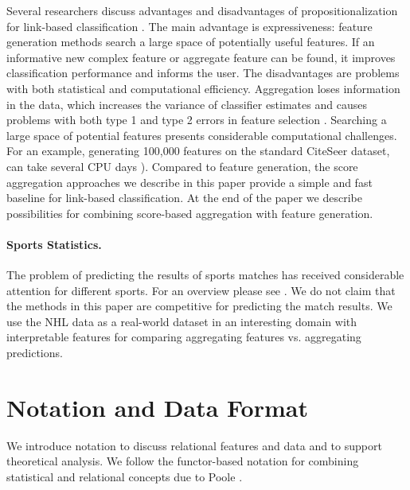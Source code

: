 \documentclass[oribibl]{llncs}%
\begin{document}
Several researchers discuss advantages and disadvantages of  propositionalization for link-based classification \cite{DavidJensen2002,han2009}. 
The main advantage is expressiveness: feature generation methods search a large space of potentially useful features. If an informative new complex feature or aggregate feature can be found, it improves classification performance and informs the user. The disadvantages are problems with both statistical and computational efficiency. Aggregation loses information in the data, which increases the variance of classifier estimates and causes problems with both type 1 and type 2 errors in feature selection \cite{Jensen2002a}. Searching a large space of potential features presents considerable computational challenges. For an example, generating 100,000 features on the standard CiteSeer dataset, can take several CPU days
\cite[Ch.16.1.2]{Popescul2007}). Compared to feature generation, the score aggregation approaches we describe in this paper provide a simple and fast baseline for link-based classification. At the end of the paper we describe possibilities for combining score-based aggregation with feature generation.

\paragraph{Sports Statistics.} The problem of predicting the results of sports matches has received considerable attention for different sports. For an overview please see \cite{Schumaker2010}. We do not claim that the methods in this paper are competitive for predicting the match results. 
We use the NHL data as a real-world dataset in an interesting domain with interpretable features for comparing aggregating features vs. aggregating predictions.

\section{Notation and Data Format} We introduce notation to discuss relational features and data and to support theoretical analysis. We follow the functor-based notation for combining statistical and relational concepts due to Poole \cite{Poole2003}.
\end{document}
